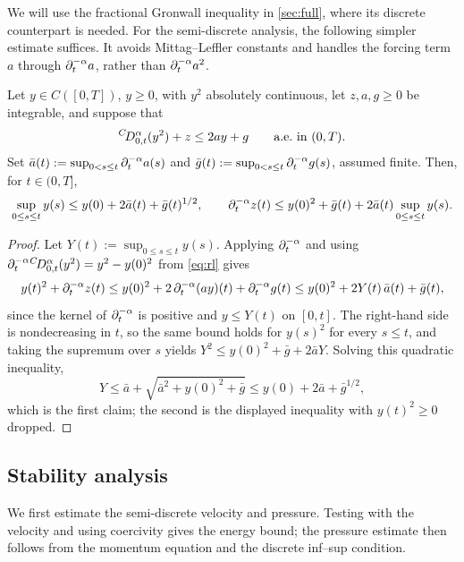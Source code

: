 We will use the fractional Gronwall inequality in \cref{sec:full}, where its discrete counterpart is needed. For the semi-discrete analysis, the following simpler estimate suffices. It avoids Mittag--Leffler constants and handles the forcing term $a$ through $\partial_t^{-\alpha} a$, rather than $\partial_t^{-\alpha} a^2$.
\begin{lemma}\label{lem:sup}
Let $y\in C([0,T])$, $y\ge0$, with $y^2$ absolutely continuous, let $z,a,g\ge0$ be integrable, and suppose that
\[
{}^{C}\!D_{0,t}^{\alpha}(y^2)+z\le 2ay+g\qquad\text{a.e.\ in }(0,T).
\]
Set $\bar a(t):=\sup_{0<s\le t}\partial_t^{-\alpha} a(s)$ and $\bar g(t):=\sup_{0<s\le t}\partial_t^{-\alpha} g(s)$, assumed finite. Then, for $t\in(0,T]$,
\begin{equation}\label{eq:sup}
\sup_{0\le s\le t}y(s)\le y(0)+2\bar a(t)+\bar g(t)^{1/2},\qquad
\partial_t^{-\alpha} z(t)\le y(0)^2+\bar g(t)+2\bar a(t)\sup_{0\le s\le t}y(s).
\end{equation}
\end{lemma}
\begin{proof}
Let $Y(t):=\sup_{0\le s\le t}y(s)$. Applying $\partial_t^{-\alpha}$ and using $\partial_t^{-\alpha}{}^{C}\!D_{0,t}^{\alpha}(y^2)=y^2-y(0)^2$ from \eqref{eq:rl} gives
\[
y(t)^2+\partial_t^{-\alpha} z(t)\le y(0)^2+2\,\partial_t^{-\alpha}(ay)(t)+\partial_t^{-\alpha} g(t)\le y(0)^2+2Y(t)\,\bar a(t)+\bar g(t),
\]
since the kernel of $\partial_t^{-\alpha}$ is positive and $y\le Y(t)$ on $[0,t]$. The right-hand side is nondecreasing in $t$, so the same bound holds for $y(s)^2$ for every $s\le t$, and taking the supremum over $s$ yields $Y^2\le y(0)^2+\bar g+2\bar aY$. Solving this quadratic inequality,
\[
Y\le\bar a+\sqrt{\bar a^2+y(0)^2+\bar g}\le y(0)+2\bar a+\bar g^{1/2},
\]
which is the first claim; the second is the displayed inequality with $y(t)^2\ge0$ dropped.
\end{proof}



\subsection{Stability analysis}
We first estimate the semi-discrete velocity and pressure. Testing with the velocity and using coercivity gives the energy bound; the pressure estimate then follows from the momentum equation and the discrete inf--sup condition.

